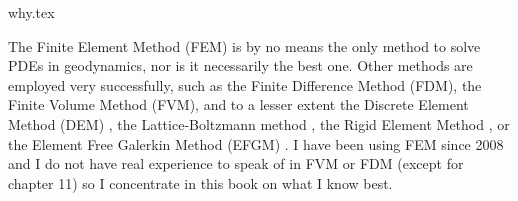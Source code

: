 \begin{flushright} {\tiny {\color{gray} why.tex}} \end{flushright}

The Finite Element Method (FEM) is by no means the only method 
to solve PDEs in geodynamics, nor is it necessarily the best one.
Other methods are employed very successfully, such as the Finite Difference 
Method (FDM), the Finite Volume Method (FVM), and to a lesser extent
the Discrete Element Method (DEM) \cite{tasy05,egho07,egsc07,funi14}, 
the Lattice-Boltzmann method \cite{hupc08}, the Rigid Element Method \cite{lacj15},  
or the Element Free Galerkin Method (EFGM) \cite{hans03}.
I have been using FEM since 2008 and I do not have real 
experience to speak of in FVM or FDM (except for chapter 11)
so I concentrate in this book 
on what I know best. 


